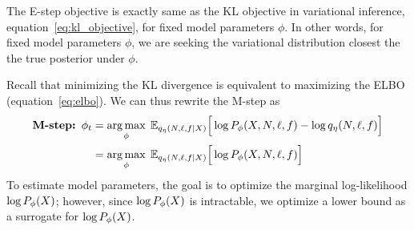 The E-step objective is exactly same as the KL objective in variational inference, equation~\ref{eq:kl_objective}, for fixed model parameters $\phi$. 
In other words, for fixed model parameters $\phi$, we are seeking the variational distribution closest the the true posterior under $\phi$. 

Recall that minimizing the KL divergence is equivalent to maximizing the ELBO (equation~\eqref{eq:elbo}). We can thus rewrite the M-step as 
\begin{align}
    \text{{\bf M-step: }} \phi_{t} &= \operatorname*{arg\,max}_{\phi} \; \mathbb{E}_{q_{\eta}(N, \ell, f | X)}\Big[\log P_\phi(X, N, \ell, f) - \log q_\eta(N, \ell, f)\Big] \\
    &= \operatorname*{arg\,max}_{\phi} \; \mathbb{E}_{q_{\eta}(N, \ell, f | X)}\Big[\log P_\phi(X, N, \ell, f)\Big]    \label{eq:m_step}
\end{align} 
To estimate model parameters, the goal is to optimize the marginal log-likelihood $\log P_\phi(X)$; however, since $\log P_\phi(X)$ is intractable, we optimize a lower bound as a surrogate for $\log P_\phi(X)$. 

